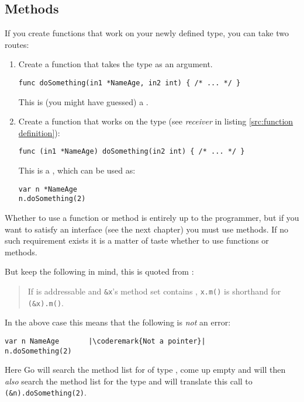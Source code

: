 \subsection{Methods}
\label{sec:methods}
If you create functions that work on your newly defined type, you can
take two routes:
\begin{enumerate}
\item Create a function that takes the type as an argument.
\begin{lstlisting}
func doSomething(in1 *NameAge, in2 int) { /* ... */ }
\end{lstlisting}
This is (you might have guessed) a .
\item Create a function that works on the type (see \emph{receiver} in
listing \ref{src:function definition}):
\begin{lstlisting}
func (in1 *NameAge) doSomething(in2 int) { /* ... */ }
\end{lstlisting}
This is a , which can be
used as: 
\begin{lstlisting}
var n *NameAge
n.doSomething(2)
\end{lstlisting}
\end{enumerate}
Whether to use a function or method is entirely up to the programmer, but
if you want to satisfy an interface (see the next chapter) you must use
methods. If no such requirement exists it is a matter of taste whether
to use functions or methods.

But keep the following in mind, this is quoted from \cite{go_spec}:
\begin{quote}
If  is
addressable and \lstinline{&x}'s method set contains , 
\lstinline{x.m()} is shorthand for \mbox{\lstinline{(&x).m()}}.
\end{quote}
In the above case this means that the following is \emph{not} an 
error:
\begin{lstlisting}
var n NameAge	    |\coderemark{Not a pointer}|
n.doSomething(2)    
\end{lstlisting}
Here Go will search the method list for  of type ,
come up empty and will then \emph{also} search the method list for
the type  and will translate this call to
\lstinline{(&n).doSomething(2)}.

